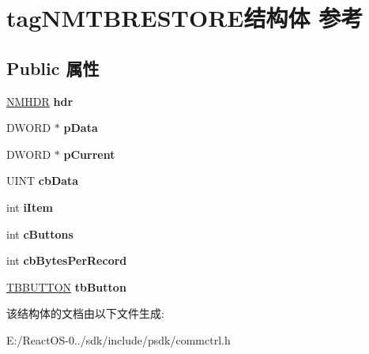 \hypertarget{structtag_n_m_t_b_r_e_s_t_o_r_e}{}\section{tag\+N\+M\+T\+B\+R\+E\+S\+T\+O\+R\+E结构体 参考}
\label{structtag_n_m_t_b_r_e_s_t_o_r_e}
\subsection*{Public 属性}
\begin{DoxyCompactItemize}
\item 
\mbox{\label{structtag_n_m_t_b_r_e_s_t_o_r_e_a51633e7b8192200297123c3209eef8d5}} 
\hyperlink{structtag_n_m_h_d_r}{N\+M\+H\+DR} {\bfseries hdr}
\item 
\mbox{\label{structtag_n_m_t_b_r_e_s_t_o_r_e_ae15c59ae4afb362772f9792f7e800769}} 
D\+W\+O\+RD $\ast$ {\bfseries p\+Data}
\item 
\mbox{\label{structtag_n_m_t_b_r_e_s_t_o_r_e_ace428cf32193279a0c1f3ec22170149f}} 
D\+W\+O\+RD $\ast$ {\bfseries p\+Current}
\item 
\mbox{\label{structtag_n_m_t_b_r_e_s_t_o_r_e_ae146a38b9c57898f446baa2b3d995b61}} 
U\+I\+NT {\bfseries cb\+Data}
\item 
\mbox{\label{structtag_n_m_t_b_r_e_s_t_o_r_e_af2d77c96ca7f77d47c505c16d7a9de52}} 
int {\bfseries i\+Item}
\item 
\mbox{\label{structtag_n_m_t_b_r_e_s_t_o_r_e_a78a4a2c6b629ce5d0d130e3d13c77071}} 
int {\bfseries c\+Buttons}
\item 
\mbox{\label{structtag_n_m_t_b_r_e_s_t_o_r_e_af61d2ce3337b41825a42c2a117d7c56b}} 
int {\bfseries cb\+Bytes\+Per\+Record}
\item 
\mbox{\label{structtag_n_m_t_b_r_e_s_t_o_r_e_a761ae0e375cc332e14f5609071739d66}} 
\hyperlink{struct___t_b_b_u_t_t_o_n}{T\+B\+B\+U\+T\+T\+ON} {\bfseries tb\+Button}
\end{DoxyCompactItemize}


该结构体的文档由以下文件生成\+:\begin{DoxyCompactItemize}
\item 
E\+:/\+React\+O\+S-\/0../sdk/include/psdk/commctrl.\+h\end{DoxyCompactItemize}
